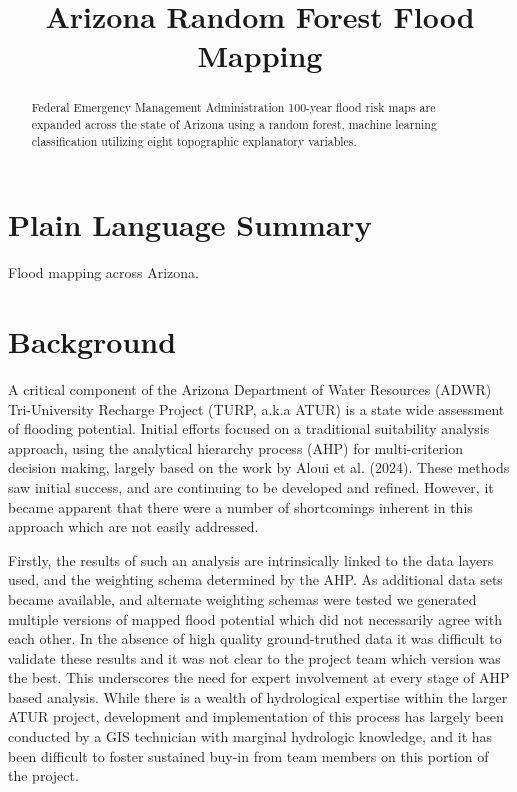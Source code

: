 \documentclass[
]{agujournal2019}
\begin{document}
\title{Arizona Random Forest Flood Mapping}



\begin{abstract}
Federal Emergency Management Administration 100-year flood risk maps are
expanded across the state of Arizona using a random forest, machine
learning classification utilizing eight topographic explanatory
variables.
\end{abstract}

\section*{Plain Language Summary}
Flood mapping across Arizona.




\section{Background}\label{background}

A critical component of the Arizona Department of Water Resources (ADWR)
Tri-University Recharge Project (TURP, a.k.a ATUR) is a state wide
assessment of flooding potential. Initial efforts focused on a
traditional suitability analysis approach, using the analytical
hierarchy process (AHP) for multi-criterion decision making, largely
based on the work by Aloui et al. (2024). These methods saw initial
success, and are continuing to be developed and refined. However, it
became apparent that there were a number of shortcomings inherent in
this approach which are not easily addressed.

Firstly, the results of such an analysis are intrinsically linked to the
data layers used, and the weighting schema determined by the AHP. As
additional data sets became available, and alternate weighting schemas
were tested we generated multiple versions of mapped flood potential
which did not necessarily agree with each other. In the absence of high
quality ground-truthed data it was difficult to validate these results
and it was not clear to the project team which version was the best.
This underscores the need for expert involvement at every stage of AHP
based analysis. While there is a wealth of hydrological expertise within
the larger ATUR project, development and implementation of this process
has largely been conducted by a GIS technician with marginal hydrologic
knowledge, and it has been difficult to foster sustained buy-in from
team members on this portion of the project.
\end{document}
